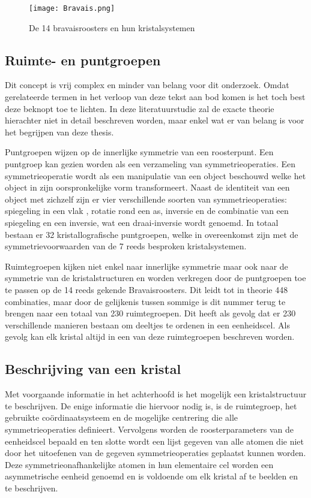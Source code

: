\begin{figure}[H]
\texttt{[image: Bravais.png]}
\caption{De 14 bravaisroosters en hun kristalsystemen}
\end{figure}

\subsection{Ruimte- en puntgroepen}
Dit concept is vrij complex en minder van belang voor dit onderzoek. Omdat gerelateerde termen in het verloop van deze tekst aan bod komen is het toch best deze beknopt toe te lichten. In deze literatuurstudie zal de exacte theorie hierachter niet in detail beschreven worden, maar enkel wat er van belang is voor het begrijpen van deze thesis.

\par
Puntgroepen wijzen op de innerlijke symmetrie van een roosterpunt. Een puntgroep kan gezien worden als een verzameling van symmetrieoperaties. Een symmetrieoperatie wordt als een manipulatie van een object beschouwd welke het object in zijn oorspronkelijke vorm transformeert. Naast de identiteit van een object met zichzelf zijn er vier verschillende soorten van symmetrieoperaties: spiegeling in een vlak , rotatie rond een as, inversie en de combinatie van een spiegeling en een inversie, wat een draai-inversie wordt genoemd. In totaal bestaan er 32 kristallografische puntgroepen, welke in overeenkomst zijn met de symmetrievoorwaarden van de 7 reeds besproken kristalsystemen. 

\par
Ruimtegroepen kijken niet enkel naar innerlijke symmetrie maar ook naar de symmetrie van de kristalstructuren en worden verkregen door de puntgroepen toe te passen op de 14 reeds gekende Bravaisroosters. Dit leidt tot in theorie 448 combinaties, maar door de gelijkenis tussen sommige is dit nummer terug te brengen naar een totaal van 230 ruimtegroepen. Dit heeft als gevolg dat er 230 verschillende manieren bestaan om deeltjes te ordenen in een eenheidscel. Als gevolg kan elk kristal altijd in een van deze ruimtegroepen beschreven worden. 

\subsection{Beschrijving van een kristal}
Met voorgaande informatie in het achterhoofd is het mogelijk een kristalstructuur te beschrijven. De enige informatie die hiervoor nodig is, is de ruimtegroep, het gebruikte coördinaatsysteem en de mogelijke centrering die alle symmetrieoperaties definieert. Vervolgens worden de roosterparameters van de eenheidscel bepaald en ten slotte wordt een lijst gegeven van alle atomen die niet door het uitoefenen van de gegeven symmetrieoperaties geplaatst kunnen worden. Deze symmetrieonafhankelijke atomen in hun elementaire cel worden een asymmetrische eenheid genoemd en is voldoende om elk kristal af te beelden en te beschrijven. 

